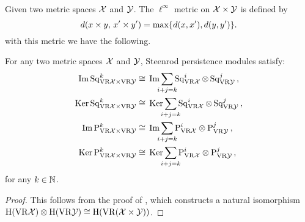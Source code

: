 \subsubsection{}

Given two metric spaces $\mathcal{X}$ and $\mathcal{Y}$.
The $\ell^\infty$ metric on $\mathcal{X} \times \mathcal{Y}$ is defined by
\[
d(x \times y, \, x' \times y') = \max\{d(x,x'), d(y,y')\}.
\]
with this metric we have the following.

\medskip\corollary
For any two metric spaces $\mathcal{X}$ and $\mathcal{Y}$,
Steenrod persistence modules satisfy:
\begin{align*}
	\img\Sq^k_{\VR\cX \times \VR\cY} &\cong\, \img\sum_{\mathclap{i+j=k}} \Sq^i_{\VR\cX} \ot \Sq^j_{\VR\cY}\,, \\ \ker\Sq^k_{\VR\cX \times \VR\cY} &\cong\, \ker\sum_{\mathclap{i+j=k}} \Sq^i_{\VR\cX} \ot \Sq^j_{\VR\cY}\,, \\
	\img\rP^k_{\VR\cX \times \VR\cY} &\cong\, \img\sum_{\mathclap{i+j=k}} \rP^i_{\VR\cX} \otimes \rP^j_{\VR\cY}\,, \\
	\ker\rP^k_{\VR\cX \times \VR\cY} &\cong\, \ker\sum_{\mathclap{i+j=k}} \rP^i_{\VR\cX} \otimes \rP^j_{\VR\cY}\,,
\end{align*}
for any $k \in \mathbb{N}$.

\begin{proof}
	This follows from the proof of \cite[Theorem~6.1(1)]{lim2020vietoris}, which constructs a natural isomorphism $\mathrm{H}(\mathrm{VR}\mathcal{X}) \otimes \mathrm{H}(\mathrm{VR}\mathcal{Y}) \cong \mathrm{H}(\mathrm{VR}(\mathcal{X} \times \mathcal{Y}))$.
\end{proof}
